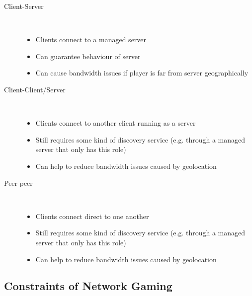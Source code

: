 \documentclass[a4paper]{article}
\begin{document}
\begin{description}
  \item[Client-Server] \hfill \\
    \begin{itemize}
      \item
        Clients connect to a managed server

      \item
        Can guarantee behaviour of server

      \item
        Can cause bandwidth issues if player is far from server geographically

    \end{itemize}

  \item[Client-Client/Server] \hfill \\
    \begin{itemize}
      \item
        Clients connect to another client running as a server

      \item
        Still requires some kind of discovery service (e.g. through a managed
        server that only has this role)

      \item
        Can help to reduce bandwidth issues caused by geolocation

    \end{itemize}

  \item[Peer-peer] \hfill \\
    \begin{itemize}
      \item
        Clients connect direct to one another

      \item
        Still requires some kind of discovery service (e.g. through a managed
        server that only has this role)

      \item
        Can help to reduce bandwidth issues caused by geolocation

    \end{itemize}

\end{description}

\subsection{Constraints of Network Gaming}
\end{document}
